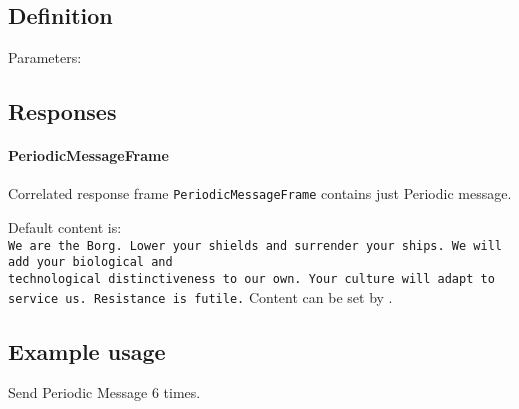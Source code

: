 \subsection{Definition}

Parameters: 

\begin{tcarglist}
\end{tcarglist}

\subsection{Responses}

\paragraph{PeriodicMessageFrame}
Correlated response frame \texttt{PeriodicMessageFrame} contains just Periodic message.

Default content is: \\
\texttt{We are the Borg. Lower your shields and surrender your ships. We will add your biological and \\
technological distinctiveness to our own. Your culture will adapt to service us. Resistance is futile.}
Content can be set by .

\subsection{Example usage}
Send Periodic Message 6 times.
